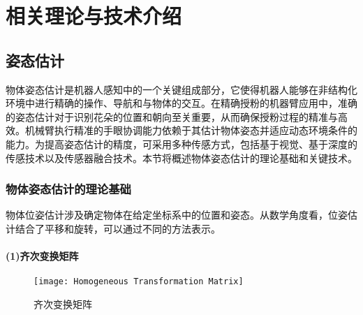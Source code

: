 \chapter{相关理论与技术介绍}\label{ch:2}
\section{姿态估计}

物体姿态估计是机器人感知中的一个关键组成部分，它使得机器人能够在非结构化环境中进行精确的操作、导航和与物体的交互。在精确授粉的机器臂应用中，准确的姿态估计对于识别花朵的位置和朝向至关重要，从而确保授粉过程的精准与高效。机械臂执行精准的手眼协调能力依赖于其估计物体姿态并适应动态环境条件的能力。为提高姿态估计的精度，可采用多种传感方式，包括基于视觉、基于深度的传感技术以及传感器融合技术。本节将概述物体姿态估计的理论基础和关键技术。

\subsection{物体姿态估计的理论基础}




物体位姿估计涉及确定物体在给定坐标系中的位置和姿态。从数学角度看，位姿估计结合了平移和旋转，可以通过不同的方法表示。
 
 \subsubsection*{(1)齐次变换矩阵}
 \FloatBarrier
 \begin{figure}[htb]
 	\texttt{[image: Homogeneous Transformation Matrix]}
 	\caption[齐次变换矩阵]{齐次变换矩阵} %
 	\label{fig:Homogeneous Transformation Matrix}
 \end{figure}
 
